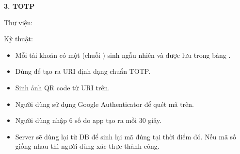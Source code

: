 \textbf{3. TOTP}

Thư viện:  

Kỹ thuật:
\begin{itemize}
    \item Mỗi tài khoản có một  (chuỗi ) sinh ngẫu nhiên và được lưu trong bảng .
    \item Dùng  để tạo ra URI định dạng chuẩn TOTP.
    \item Sinh ảnh QR code từ URI trên.
    \item Người dùng sử dụng Google Authenticator để quét mã trên.
    \item Người dùng nhập 6 số do app tạo ra mỗi 30 giây.
    \item Server sẽ dùng lại  từ DB để sinh lại mã đúng tại thời điểm đó. Nếu mã số giống nhau thì người dùng xác thực thành công.
\end{itemize}